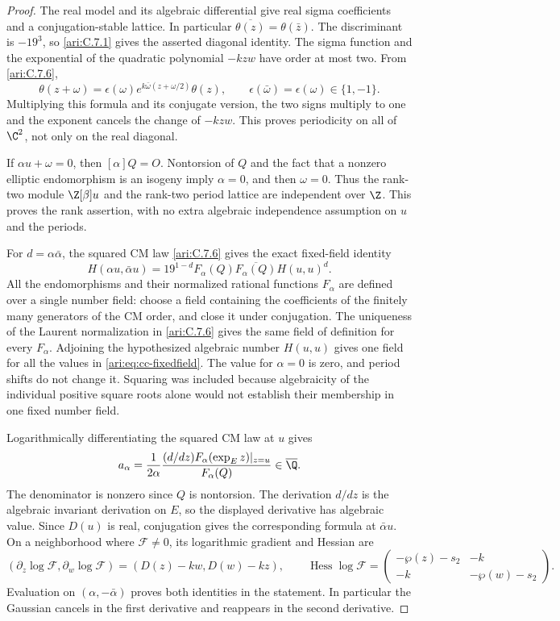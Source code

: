\begin{proof}
The real model and its algebraic differential give real sigma
coefficients and a conjugation-stable lattice. In particular
$\overline{\theta(z)}=\theta(\bar z)$. The discriminant is
$-19^3$, so \ref{ari:C.7.1} gives the asserted diagonal identity.
The sigma function and the exponential of the quadratic
polynomial $-kzw$ have order at most two. From \ref{ari:C.7.6},
\[
 \theta(z+\omega)=\epsilon(\omega)
         e^{k\bar\omega(z+\omega/2)}\theta(z),
 \qquad \epsilon(\bar\omega)=\epsilon(\omega)\in\{1,-1\}.
\]
Multiplying this formula and its conjugate version, the two
signs multiply to one and the exponent cancels the change of
$-kzw$. This proves periodicity on all of $\C^2$, not only
on the real diagonal.

If $\alpha u+\omega=0$, then $[\alpha]Q=O$.
Nontorsion of $Q$ and the fact that a nonzero elliptic
endomorphism is an isogeny imply $\alpha=0$, and then
$\omega=0$. Thus the rank-two module $\Z[\beta]u$ and the
rank-two period lattice are independent over $\Z$.
This proves the rank assertion, with no extra algebraic
independence assumption on $u$ and the periods.

For $d=\alpha\bar\alpha$, the squared CM law \ref{ari:C.7.6} gives
the exact fixed-field identity
\begin{equation}\label{ari:eq:cc-fixedfield}
 H(\alpha u,\bar\alpha u)
   =19^{1-d}F_\alpha(Q)\overline{F_\alpha(Q)}H(u,u)^d.
\end{equation}
All the endomorphisms and their normalized rational functions
$F_\alpha$ are defined over a single number field: choose
a field containing the coefficients of the finitely many
generators of the CM order, and close it under conjugation.
The uniqueness of the Laurent normalization in \ref{ari:C.7.6} gives
the same field of definition for every $F_\alpha$.
Adjoining the hypothesized algebraic number $H(u,u)$ gives
one field for all the values in \eqref{ari:eq:cc-fixedfield}.
The value for $\alpha=0$ is zero, and period shifts do not
change it. Squaring was included because algebraicity of the
individual positive square roots alone would not establish
their membership in one fixed number field.

Logarithmically differentiating the squared CM law at $u$
gives
\[
 a_\alpha=\frac{1}{2\alpha}
     \frac{(d/dz)F_\alpha(\exp_Ez)|_{z=u}}{F_\alpha(Q)}
                  \in\overline{\Q}.
\]
The denominator is nonzero since $Q$ is nontorsion. The
derivation $d/dz$ is the algebraic invariant derivation on
$E$, so the displayed derivative has algebraic value.
Since $D(u)$ is real, conjugation gives the corresponding
formula at $\bar\alpha u$. On a neighborhood where
$\mathcal F\ne0$, its logarithmic gradient and Hessian are
\[
 (\partial_z\log\mathcal F,\partial_w\log\mathcal F)
       =(D(z)-kw,D(w)-kz),\qquad
 \operatorname{Hess}\log\mathcal F=
 \begin{pmatrix}-\wp(z)-s_2&-k\\-k&-\wp(w)-s_2\end{pmatrix}.
\]
Evaluation on $(\alpha,-\bar\alpha)$ proves both identities
in the statement. In particular the Gaussian cancels in the
first derivative and reappears in the second derivative.


\end{proof}
